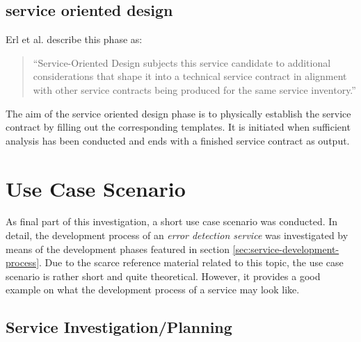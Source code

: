 \subsection{service oriented design}

Erl et al. \cite[p.86]{erl2011} describe this phase as:
\begin{quote}
``Service-Oriented Design subjects this service candidate to additional considerations that shape it into a technical service contract in alignment with other service contracts being produced for the same service inventory.''
\end{quote}


The aim of the service oriented design phase is to physically establish the service contract by filling out the corresponding templates. It is initiated when sufficient analysis has been conducted and ends with a finished service contract as output.








\section{Use Case Scenario}

As final part of this investigation, a short use case scenario was conducted. In detail, the development process of an \emph{error detection service} was investigated by means of the development phases featured in section \ref{sec:service-development-process}. Due to the scarce reference material related to this topic, the use case scenario is rather short and quite theoretical. However, it provides a good example on what the development process of a service may look like.

\subsection{Service Investigation/Planning}


